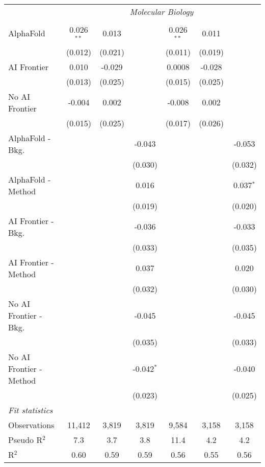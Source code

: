 \begin{tabular}{lcccccc}
 & \multicolumn{6}{c}{\textit{Molecular Biology}} \\ \\
   AlphaFold               & 0.026$^{**}$ & 0.013   &              & 0.026$^{**}$ & 0.011   &   \\   
                           & (0.012)      & (0.021) &              & (0.011)      & (0.019) &   \\   
   AI Frontier             & 0.010        & -0.029  &              & 0.0008       & -0.028  &   \\   
                           & (0.013)      & (0.025) &              & (0.015)      & (0.025) &   \\   
   No AI Frontier          & -0.004       & 0.002   &              & -0.008       & 0.002   &   \\   
                           & (0.015)      & (0.025) &              & (0.017)      & (0.026) &   \\   
   AlphaFold - Bkg.        &              &         & -0.043       &              &         & -0.053\\   
                           &              &         & (0.030)      &              &         & (0.032)\\   
   AlphaFold - Method      &              &         & 0.016        &              &         & 0.037$^{*}$\\   
                           &              &         & (0.019)      &              &         & (0.020)\\   
   AI Frontier - Bkg.      &              &         & -0.036       &              &         & -0.033\\   
                           &              &         & (0.033)      &              &         & (0.035)\\   
   AI Frontier - Method    &              &         & 0.037        &              &         & 0.020\\   
                           &              &         & (0.032)      &              &         & (0.030)\\   
   No AI Frontier - Bkg.   &              &         & -0.045       &              &         & -0.045\\   
                           &              &         & (0.035)      &              &         & (0.033)\\   
   No AI Frontier - Method &              &         & -0.042$^{*}$ &              &         & -0.040\\   
                           &              &         & (0.023)      &              &         & (0.025)\\   
   \midrule
   \emph{Fit statistics}\\
   Observations            & 11,412       & 3,819   & 3,819        & 9,584        & 3,158   & 3,158\\  
   Pseudo R$^2$            & 7.3          & 3.7     & 3.8          & 11.4         & 4.2     & 4.2\\  
   R$^2$                   & 0.60         & 0.59    & 0.59         & 0.56         & 0.55    & 0.56\\  
   

\end{tabular}
